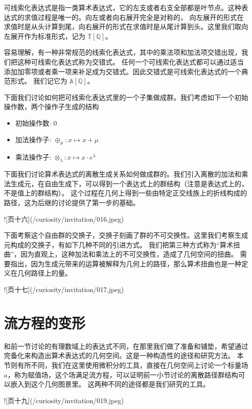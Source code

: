 \documentclass[a4paper,12pt]{book}
\numberwithin{problem}{section}
\numberwithin{definition}{section}
\numberwithin{lemma}{section}
\numberwithin{proposition}{section}
\numberwithin{theorem}{section}
\numberwithin{grammar}{section}
\numberwithin{program}{section}
\numberwithin{convention}{section}
\numberwithin{corollary}{section}
\begin{document}
可线索化表达式是指一类算术表达式，它的左支或者右支全部都是叶节点。这种表达式的求值过程是唯一的。向左或者向右展开完全是对称的，
向左展开的形式在求值时是从头计算到尾，向右展开的形式在求值时是从尾计算到头。这里我们取向左展开作为标准形式，记为 $\mathbb{T} \left [\mathbb{Q} \right ]$。

容易理解，有一种非常规范的线索化表达式，其中的乘法项和加法项交错出现，我们把这种可线索化表达式称为交错式。
任何一个可线索化表达式都可以通过适当添加加零项或者乘一项来补足成为交错式。因此交错式是可线索化表达式的一个典范形式。
我们记它为 $\mathbb{A} \left [\mathbb{Q} \right ]$。

下面我们讨论如何把可线索化表达式里的一个子集做成群。我们考虑如下一个初始操作数，两个操作子生成的结构
\begin{itemize}
\item 初始操作数: $0$
\item 加法操作子: $\oplus_\mu: x \mapsto x + \mu$
\item 乘法操作子: $\otimes_\lambda: x \mapsto x \cdot e^\lambda$
\end{itemize}

下面我们讨论算术表达式的离散生成关系如何做成群的。我们引入离散的加法和乘法生成元，在自由生成下，可以得到一个表达式上的群结构（注意是表达式上的，不是值上的群结构）。
这个过程在几何上得到一些由特定正交线族上的折线构成的路径，这为后继的讨论提供了第一步的基础。

![页十六](/curiosity/invitation/016.jpeg)

下面考察这个自由群的交换子，交换子刻画了群的不可交换性。这里我们考察生成元构成的交换子，有如下几种不同的引进方式。
我们把第三种方式称为“算术扭曲”，因为直观上，这种加法和乘法上的不可交换性，造成了几何空间的扭曲。
需要指出，因为生成元带来的运算被解释为几何上的路径，那么算术扭曲也是一种定义在几何路径上的量。

![页十七](/curiosity/invitation/017.jpeg)

\section{流方程的变形}

和前一节讨论的有理数域上的表达式不同，在那里我们做了准备和铺垫，希望通过完备化来构造出算术表达式的几何空间。这是一种构造性的途径和研究方法。
本节则有所不同，我们在这里使用微积分的工具，直接在几何空间上讨论一个标量场$a$，称为赋值场，这个场满足流方程，可以证明前一小节讨论的离散路径群结构可以嵌入到这个几何图景里。
这两种不同的途径都是我们研究的工具。

![页十九](/curiosity/invitation/019.jpeg)
\end{document}
